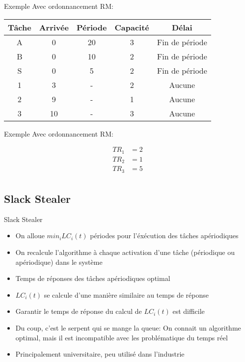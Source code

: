 \begin{frame}{Exemple}
  Avec ordonnancement RM:
  \begin{center}
    \begin{tabular}{ccccc}
      \hline
      Tâche & Arrivée & Période & Capacité & Délai \\
      \hline
      A &  0 & 20 & 3 & Fin de période\\
      B &  0 & 10 & 2 & Fin de période\\
      S &  0 &  5 & 2 & Fin de période\\
      1 &  3 &  - & 2 & Aucune\\
      2 &  9 &  - & 1 & Aucune\\
      3 & 10 &  - & 3 & Aucune\\
      \hline
    \end{tabular}
    \pause
  
  \end{center}
\end{frame} 

\begin{frame}{Exemple}
  Avec ordonnancement RM:
  \begin{center}
    
    \begin{align*}
      TR_1 &= 2\\
      TR_2 &= 1\\
      TR_3 &= 5\\
    \end{align*}
  \end{center}
\end{frame} 

\subsection{Slack Stealer}

\begin{frame}{Slack Stealer}
  \begin{itemize} 
  \item On alloue $min_i LC_i(t)$ périodes pour l'éxécution des tâches
    apériodiques
  \item  On recalcule  l'algorithme  à chaque  activation d'une  tâche
    (périodique ou apériodique) dans le système
  \item Temps de réponses des tâches apériodiques optimal
  \item  $LC_i(t)$ se  calcule  d'une manière  similaire  au temps  de
    réponse
  \item  Garantir le  temps  de  réponse du  calcul  de $LC_i(t)$  est
    difficile
  \item Du coup, c'est le serpent qui se mange la queue: On connait un
    algorithme   optimal,   mais   il   est  incompatible   avec   les
    problématique du temps réel
  \item Principalement universitaire, peu utilisé dans l'industrie
  \end{itemize}
\end{frame} 

